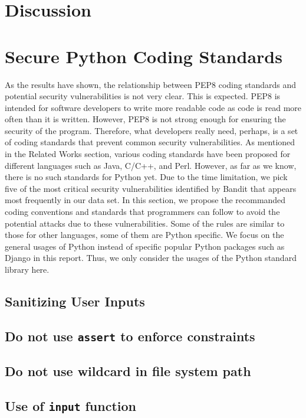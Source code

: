 \documentclass[sigconf]{acmart}
\begin{document}
\section{Discussion}

\section{Secure Python Coding Standards}
As the results have shown, the relationship between PEP8 coding standards and potential security vulnerabilities is not very clear. This is expected. PEP8 is intended for software developers to write more readable code as code is read more often than it is written\cite{PEP8}. However, PEP8\cite{PEP8} is not strong enough for ensuring the security of the program. Therefore, what developers really need, perhaps, is a set of coding standards that prevent common security vulnerabilities. As mentioned in the Related Works section, various coding standards have been proposed for different languages such as Java, C/C++, and Perl\cite{SEI_CERT}. However, as far as we know, there is no such standards for Python yet. Due to the time limitation, we pick five of the most critical security vulnerabilities identified by Bandit that appears most frequently in our data set. In this section, we propose the recommanded coding conventions and standards that programmers can follow to avoid the potential attacks due to these vulnerabilities. Some of the rules are similar to those for other languages, some of them are Python specific. We focus on the general usages of Python instead of specific popular Python packages such as Django in this report. Thus, we only consider the usages of the Python standard library here. 

\subsection{Sanitizing User Inputs}

\subsection{Do not use \texttt{assert} to enforce constraints}

\subsection{Do not use wildcard in file system path}

\subsection{Use of \texttt{input} function}
\end{document}
